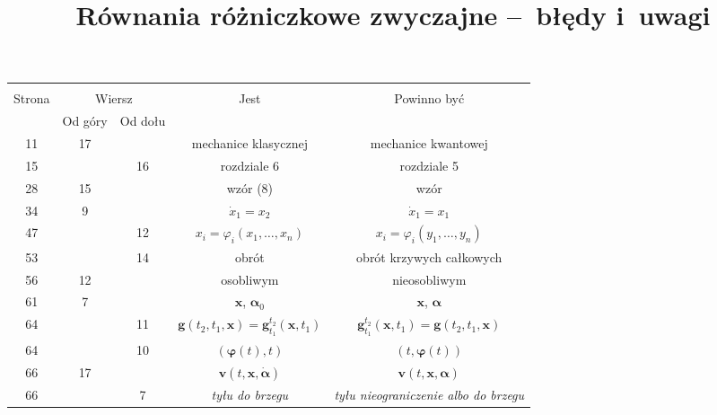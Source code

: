 \documentclass[a4paper,11pt]{article}
\title{Równania różniczkowe zwyczajne --~błędy i~uwagi}
\begin{document}



\maketitle %





\begin{center}
  \begin{tabular}{|c|c|c|c|c|}
    \hline
    & \multicolumn{2}{c|}{} & & \\
    Strona & \multicolumn{2}{c|}{Wiersz} & Jest
                              & Powinno być \\ \cline{2-3}
    & Od góry & Od dołu & & \\
    \hline
    11  & 17 & & mechanice klasycznej & mechanice kwantowej \\
    15  & & 16 & rozdziale 6 & rozdziale 5 \\
    28  & 15 & & wzór (8) & wzór \\
    34  &  9 & & $\dot{ x }_{ 1 } = x_{ 2 }$ & $\dot{ x }_{ 1 } = x_{ 1 }$ \\
    47  & & 12 & $x_{ i } = \varphi_{ i }( x_{ 1 }, \ldots, x_{ n } )$
           & $x_{ i } = \varphi_{ i }( y_{ 1 }, \ldots, y_{ n } )$ \\
    53 & & 14 & obrót & obrót krzywych całkowych \\
    56 & 12 & & osobliwym & nieosobliwym \\
    61 & 7 & & $\mathbf{x}$, $\boldsymbol\alpha_{ 0 }$ & $\mathbf{x}$, $\boldsymbol\alpha$ \\
    64 & & 11 & $\mathbf{g}( t_{ 2 }, t_{ 1 }, \mathbf{x} ) = \mathbf{g}^{ t_{ 2 } }_{ t_{ 1 } }( \mathbf{x}, t_{ 1 } )$ & $\mathbf{g}^{ t_{ 2 } }_{ t_{ 1 } }( \mathbf{x}, t_{ 1 } ) = \mathbf{g}( t_{ 2 }, t_{ 1 }, \mathbf{x} )$ \\
    64 & & 10 & $( \mathbf{\varphi}( t ), t )$ & $( t, \mathbf{\varphi}( t ) )$ \\
    66 & 17 & & $\mathbf{v}( t, \mathbf{x}, \dot{ \boldsymbol\alpha } )$ & $\mathbf{v}( t, \mathbf{x}, \boldsymbol\alpha )$ \\
    66 & & 7 & \emph{tyłu do brzegu} & \emph{tyłu nieograniczenie albo do brzegu} \\

\end{tabular}
\end{center}
\end{document}
